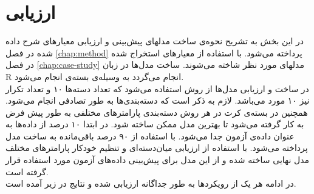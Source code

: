 \chapter{ارزیابی}
\label{chap:evaluation}
در این بخش به تشریح نحوه‌ی ساخت مدلهای پیش‌بینی و ارزیابی معیارهای شرح داده شده در فصل \ref{chap:method} پرداخته می‌شود. با استفاده از معیارهای استخراج شده در فصل \ref{chap:case-study} مدلهای مورد نظر شاخته می‌شوند. ساخت مدل‌ها در زبان R انجام می‌گردد به وسیله‌ی بسته‌ی  \cite{kuhn2008caret} انجام می‌شود.\\
در ساخت و ارزیابی مدل‌ها از روش  استفاده می‌شود که تعداد دسته‌ها ۱۰ و تعداد تکرار نیز ۱۰ مورد می‌باشد. لازم به ذکر است که دسته‌بندی‌ها به طور تصادفی انجام می‌شود.  همچنین در بسته‌ی کرت در هر روش دسته‌بندی پارامترهای مختلفی به طور پیش فرض به کار گرفته می‌شود تا بهترین مدل ممکن ساخته شود. در ابتدا ۱۰ درصد از داده‌ها به عنوان داده‌ی آزمون جدا می‌شود. با استفاده از ۹۰ درصد باقی‌مانده به ساخت مدل پرداخته می‌شود.  با استفاده از ارزیابی میان‌دسته‌ای و تنظیم خودکار پارامترهای مختلف مدل نهایی ساخته شده و از این مدل برای پیش‌بینی داده‌های آزمون مورد استفاده قرار گرفته است.  \\
در ادامه هر یک از رویکردها به طور جداگانه ارزیابی شده و نتایج در زیر آمده است. 


